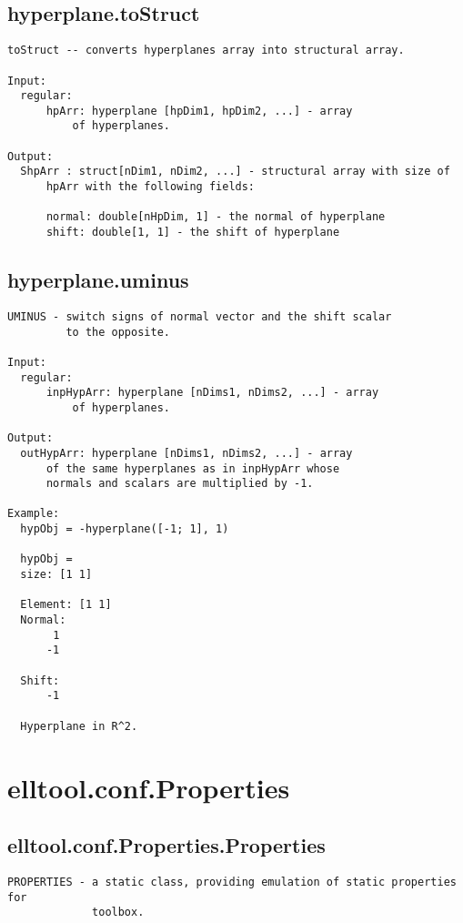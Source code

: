 \subsection{\texorpdfstring{hyperplane.toStruct}{toStruct}}\label{method:hyperplane.toStruct}
\begin{verbatim}
toStruct -- converts hyperplanes array into structural array.

Input:
  regular:
      hpArr: hyperplane [hpDim1, hpDim2, ...] - array
          of hyperplanes.

Output:
  ShpArr : struct[nDim1, nDim2, ...] - structural array with size of
      hpArr with the following fields:

      normal: double[nHpDim, 1] - the normal of hyperplane
      shift: double[1, 1] - the shift of hyperplane
\end{verbatim}
\subsection{\texorpdfstring{hyperplane.uminus}{uminus}}\label{method:hyperplane.uminus}
\begin{verbatim}
UMINUS - switch signs of normal vector and the shift scalar
         to the opposite.

Input:
  regular:
      inpHypArr: hyperplane [nDims1, nDims2, ...] - array
          of hyperplanes.

Output:
  outHypArr: hyperplane [nDims1, nDims2, ...] - array
      of the same hyperplanes as in inpHypArr whose
      normals and scalars are multiplied by -1.

Example:
  hypObj = -hyperplane([-1; 1], 1)

  hypObj =
  size: [1 1]

  Element: [1 1]
  Normal:
       1
      -1

  Shift:
      -1

  Hyperplane in R^2.
\end{verbatim}
\section{elltool.conf.Properties}\label{secClassDescr:elltool.conf.Properties}
\subsection{\texorpdfstring{elltool.conf.Properties.Properties}{Properties}}\label{method:elltool.conf.Properties.Properties}
\begin{verbatim}
PROPERTIES - a static class, providing emulation of static properties for
             toolbox.
\end{verbatim}
